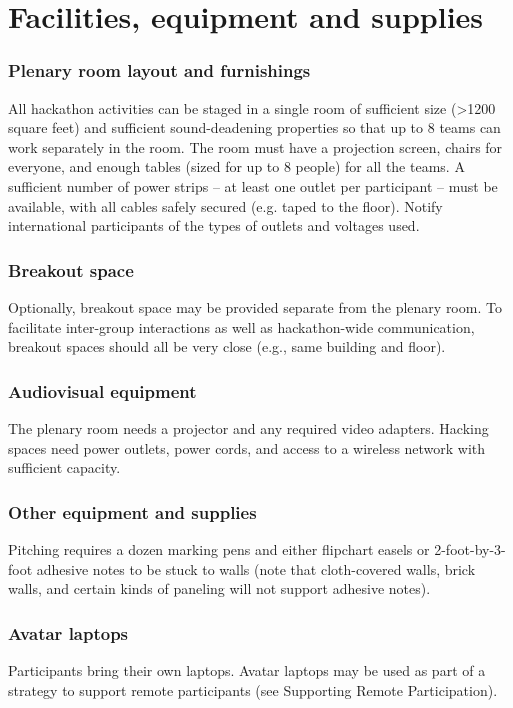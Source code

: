 \documentclass[letterpaper,11pt]{texMemo}
\begin{document}
\newpage
\section{Facilities, equipment and supplies}
\subsubsection*{Plenary room layout and furnishings} 
All hackathon activities can be staged in a single room of sufficient size (>1200 square feet) and sufficient sound-deadening properties so that up to 8 teams can work separately in the room. The room must have a projection screen, chairs for everyone, and enough tables (sized for up to 8 people) for all the teams. A sufficient number of power strips – at least one outlet per participant – must be available, with all cables safely secured (e.g. taped to the floor). Notify international participants of the types of outlets and voltages used.

\subsubsection*{Breakout space} 
Optionally, breakout space may be provided separate from the plenary room.  To facilitate inter-group interactions as well as hackathon-wide communication, breakout spaces should all be very close (e.g., same building and floor).
\subsubsection*{Audiovisual equipment} 
The plenary room needs a projector and any required video adapters. Hacking spaces need power outlets, power cords, and access to a wireless network with sufficient capacity.  
\subsubsection*{Other equipment and supplies} 
Pitching requires a dozen marking pens and either flipchart easels or 2-foot-by-3-foot adhesive notes to be stuck to walls (note that cloth-covered walls, brick walls, and certain kinds of paneling will not support adhesive notes). 
\subsubsection*{Avatar laptops} 
Participants bring their own laptops. Avatar laptops may be used as part of a strategy to support remote participants (see Supporting Remote Participation). 
\end{document}
